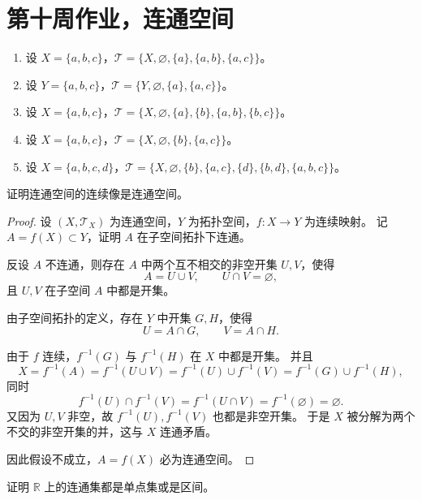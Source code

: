 \section{第十周作业，连通空间}
\begin{homework}[1]

\begin{enumerate}
  \item 
  设 $X=\{a,b,c\}$，$\mathcal{T}=\{X,\varnothing,\{a\},\{a,b\},\{a,c\}\}$。

  \item
  设 $Y=\{a,b,c\}$，$\mathcal{T}=\{Y,\varnothing,\{a\},\{a,c\}\}$。

  \item
  设 $X=\{a,b,c\}$，$\mathcal{T}=\{X,\varnothing,\{a\},\{b\},\{a,b\},\{b,c\}\}$。

  \item
  设 $X=\{a,b,c\}$，$\mathcal{T}=\{X,\varnothing,\{b\},\{a,c\}\}$。

  \item
  设 $X=\{a,b,c,d\}$，$\mathcal{T}=\{X,\varnothing,\{b\},\{a,c\},\{d\},\{b,d\},\{a,b,c\}\}$。
\end{enumerate}

\end{homework}
\begin{homework}[2] 
证明连通空间的连续像是连通空间。

\end{homework}
\begin{proof}
设 $(X,\mathcal{T}_X)$ 为连通空间，$Y$ 为拓扑空间，$f:X\to Y$ 为连续映射。
记 $A = f(X)\subset Y$，证明 $A$ 在子空间拓扑下连通。

反设 $A$ 不连通，则存在 $A$ 中两个互不相交的非空开集 $U,V$，使得
\[
A = U \cup V,\qquad U\cap V = \varnothing,
\]
且 $U,V$ 在子空间 $A$ 中都是开集。

由子空间拓扑的定义，存在 $Y$ 中开集 $G,H$，使得
\[
U = A\cap G,\qquad V = A\cap H.
\]

由于 $f$ 连续，$f^{-1}(G)$ 与 $f^{-1}(H)$ 在 $X$ 中都是开集。
并且
\[
X = f^{-1}(A) = f^{-1}(U\cup V)
= f^{-1}(U)\cup f^{-1}(V)
= f^{-1}(G)\cup f^{-1}(H),
\]
同时
\[
f^{-1}(U)\cap f^{-1}(V)
= f^{-1}(U\cap V)
= f^{-1}(\varnothing)
= \varnothing.
\]
又因为 $U,V$ 非空，故 $f^{-1}(U),f^{-1}(V)$ 也都是非空开集。
于是 $X$ 被分解为两个不交的非空开集的并，这与 $X$ 连通矛盾。

因此假设不成立，$A=f(X)$ 必为连通空间。
\end{proof}
\begin{homework}[3]
证明 $\mathbb{R}$ 上的连通集都是单点集或是区间。
\end{homework}
